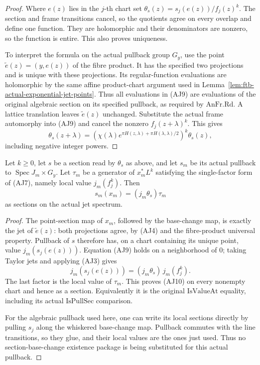 \begin{proof}
Where \(e(z)\) lies in the \(j\)-th chart set
\(\theta_s(z)=s_j(e(z))/f_j(z)^k\).
The section and frame transitions cancel, so the quotients
agree on every overlap and define one function.
They are holomorphic and their denominators are nonzero,
so the function is entire. This also proves uniqueness.

To interpret the formula on the actual pullback group
\(G_y\), use the point
\(\widetilde e(z)=(y,e(z))\) of the fibre product.
It has the specified two projections and is unique with
these projections. Its regular-function evaluations are
holomorphic by the same affine product-chart argument used
in Lemma~\ref{lem:ftb-actual-exponential-jet-points}.
Thus all evaluations in (AJ9) are evaluations of the
original algebraic section on its specified pullback,
as required by \(\mathrm{AnFr.Rd}\).
A lattice translation leaves \(\widetilde e(z)\) unchanged.
Substitute the actual frame automorphy into (AJ9) and
cancel the nonzero \(f_j(z+\lambda)^k\).
This gives
\[
             \theta_s(z+\lambda)
                 =\left(\chi(\lambda)
                   e^{\pi H(z,\lambda)+\pi H(\lambda,\lambda)/2}\right)^k
                       \theta_s(z),
\]
including negative integer powers.
\end{proof}

\begin{srlemma}
\label{lem:ftb-actual-section-jet-value}
Let \(k\geq0\), let \(s\) be a section read by \(\theta_s\)
as above, and let \(s_m\) be its actual pullback to
\(\operatorname{Spec}J_m\times G_y\).
Let \(\tau_m\) be a generator of \(x_m^*L^k\) satisfying
the single-factor form of (AJ7), namely local value
\(j_m(f_j^k)\). Then
\[
                         s_m(x_m)=(j_m\theta_s)\tau_m     \tag{AJ10}
\]
as sections on the actual jet spectrum.
\end{srlemma}

\begin{proof}
The point-section map of \(x_m\), followed by the base-change
map, is exactly the jet of \(\widetilde e(z)\): both
projections agree, by (AJ4) and the fibre-product universal
property. Pullback of \(s\) therefore has, on a chart
containing its unique point, value
\(j_m(s_j(e(z)))\).
Equation (AJ9) holds on a neighborhood of \(0\); taking
Taylor jets and applying (AJ3) gives
\[
             j_m(s_j(e(z)))=(j_m\theta_s)\,j_m(f_j^k).
\]
The last factor is the local value of \(\tau_m\).
This proves (AJ10) on every nonempty chart and hence as a
section. Equivalently it is the original
\(\mathrm{IsValueAt}\) equality, including its actual
\(\mathrm{IsPullSec}\) comparison.

For the algebraic pullback used here, one can write its
local sections directly by pulling \(s_j\) along the
whiskered base-change map. Pullback commutes with the line
transitions, so they glue, and their local values are the
ones just used. Thus no section-base-change existence
package is being substituted for this actual pullback.
\end{proof}

